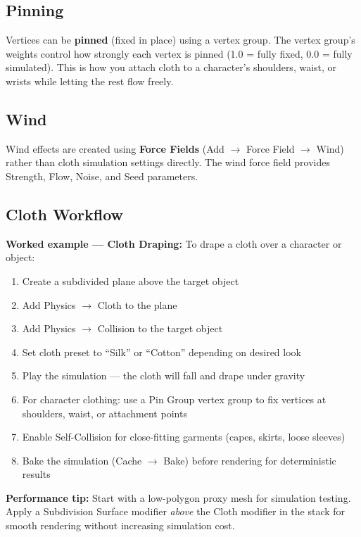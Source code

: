 \subsection{Pinning}

Vertices can be \textbf{pinned} (fixed in place) using a vertex group. The vertex group's weights control how strongly each vertex is pinned (1.0 = fully fixed, 0.0 = fully simulated). This is how you attach cloth to a character's shoulders, waist, or wrists while letting the rest flow freely.

\subsection{Wind}

Wind effects are created using \textbf{Force Fields} (Add $\rightarrow$ Force Field $\rightarrow$ Wind) rather than cloth simulation settings directly. The wind force field provides Strength, Flow, Noise, and Seed parameters.

\subsection{Cloth Workflow}

\begin{tipbox}
\textbf{Worked example --- Cloth Draping:} To drape a cloth over a character or object:

\begin{enumerate}[leftmargin=1.5em]
  \item Create a subdivided plane above the target object
  \item Add Physics $\rightarrow$ Cloth to the plane
  \item Add Physics $\rightarrow$ Collision to the target object
  \item Set cloth preset to ``Silk'' or ``Cotton'' depending on desired look
  \item Play the simulation --- the cloth will fall and drape under gravity
  \item For character clothing: use a Pin Group vertex group to fix vertices at shoulders, waist, or attachment points
  \item Enable Self-Collision for close-fitting garments (capes, skirts, loose sleeves)
  \item Bake the simulation (Cache $\rightarrow$ Bake) before rendering for deterministic results
\end{enumerate}

\textbf{Performance tip:} Start with a low-polygon proxy mesh for simulation testing. Apply a Subdivision Surface modifier \textit{above} the Cloth modifier in the stack for smooth rendering without increasing simulation cost.
\end{tipbox}

